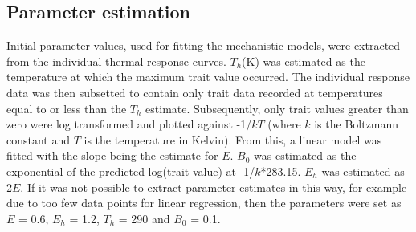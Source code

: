 \documentclass[11pt]{article}
\begin{document}
\subsection{Parameter estimation}
Initial parameter values, used for fitting the mechanistic models, were extracted from the individual thermal response curves. \begin{math}T_h\end{math}(K) was estimated as the temperature at which the maximum trait value occurred. The individual response data was then subsetted to contain only trait data recorded at temperatures equal to or less than the \begin{math}T_h\end{math} estimate. Subsequently, only trait values greater than zero were log transformed and plotted against -1/\begin{math}kT\end{math} (where \begin{math}k\end{math} is the Boltzmann constant and \begin{math}T\end{math} is the temperature in Kelvin). From this, a linear model was fitted with the slope being the estimate for \begin{math}E\end{math}. \begin{math}B_0\end{math} was estimated as the exponential of the predicted log(trait value) at -1/\begin{math}k\end{math}*283.15. \begin{math}E_h\end{math} was estimated as 2\begin{math}E\end{math}. If it was not possible to extract parameter estimates in this way, for example due to too few data points for linear regression, then the parameters were set as \begin{math}E\end{math} = 0.6, \begin{math}E_h\end{math} = 1.2, \begin{math}T_h\end{math} = 290 and \begin{math}B_0\end{math} = 0.1.
\end{document}
